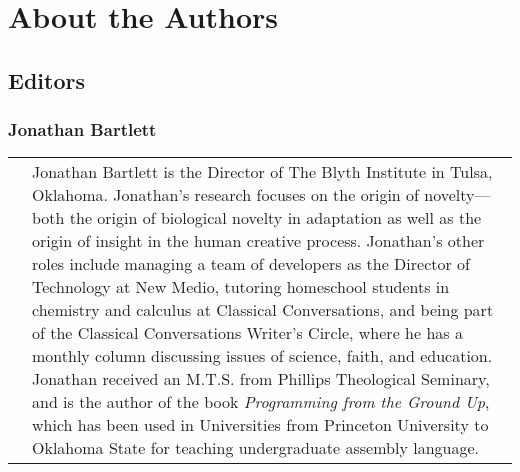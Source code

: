 \chapter*{About the Authors}

\newenvironment{authorbio}[2]{
    \newpage
    \subsection*{#1}
    \begin{tabular}{ll}
    \begin{minipage}{1in}
        \ifstrequal{#2}{}{}  %
        {
            \texttt{[image: \#2]}
        }
    \end{minipage}
        &
    \begin{minipage}{\textwidth-1.2in}
    }{ %
    \end{minipage}
    \end{tabular}
}

\section{Editors}

\begin{authorbio}{Jonathan Bartlett}{bartlett_photo.jpg}
Jonathan Bartlett is the Director of The Blyth Institute in Tulsa, Oklahoma.  Jonathan's research focuses on the origin of novelty---both the origin of biological novelty in adaptation as well as the origin of insight in the human creative process.  Jonathan's other roles include managing a team of developers as the Director of Technology at New Medio, tutoring homeschool students in chemistry and calculus at Classical Conversations, and being part of the Classical Conversations Writer's Circle, where he has a monthly column discussing issues of science, faith, and education.  Jonathan received an M.T.S. from Phillips Theological Seminary, and is the author of the book \textit{Programming from the Ground Up}, which has been used in Universities from Princeton University to Oklahoma State for teaching undergraduate assembly language.
\end{authorbio}

